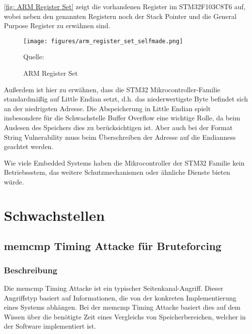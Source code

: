 \documentclass[a4paper,
DIV=13,
12pt,
BCOR=10mm,
department=FakIM,
oneside,
parskip=half,
automark,
listof=totocnumbered,
bibliography=totocnumbered,
acronym=totocnumbered
] {OTHRartcl}
\newcommand*{\quelle}[1]{\par\raggedleft\footnotesize Quelle:~#1}
\begin{document}
\autoref{fig: ARM Register Set} zeigt die vorhandenen Register im STM32F103C8T6 auf, wobei neben den genannten Registern noch der Stack Pointer und die General Purpose Register zu erwähnen sind. \cite{STM32F103Cx DataSheets}
\begin{figure}[ht!]
\begin{center}
  \texttt{[image: figures/arm\_register\_set\_selfmade.png]}
  \quelle{\cite{STM32F103Cx DataSheets}}
  \caption{ARM Register Set}
  \label{fig: ARM Register Set}
\end{center}
\end{figure}

Außerdem ist hier zu erwähnen, dass die STM32 Mikrocontroller-Familie standardmäßig auf Little Endian setzt, d.h. das niederwertigste Byte befindet sich an der niedrigsten Adresse. %
Die Abspeicherung in Little Endian spielt insbesondere für die Schwachstelle Buffer Overflow eine wichtige Rolle, da beim Auslesen des
Speichers dies zu berücksichtigen ist. Aber auch bei der Format String Vulnerability muss beim Überschreiben der Adresse auf die Endianness geachtet werden. \cite{STM32F103Cx DataSheets} \cite{STM32F10xxx/20xxx/21xxx/L1xxx3Cx8 DataSheets}

Wie viele Embedded Systems haben die Mikrocontroller der STM32 Familie kein Betriebssstem, das weitere Schutzmechanismen oder ähnliche Dienste bieten würde.

\section{Schwachstellen}
\label{sec:Schwachstellen}
\subsection{memcmp Timing Attacke für Bruteforcing}
\subsubsection{Beschreibung}
Die memcmp Timing Attacke ist ein typischer Seitenkanal-Angriff. Dieser Angriffstyp basiert auf Informationen, die von der konkreten Implementierung eines Systems abhängen.
Bei der memcmp Timing Attacke basiert dies auf dem Wissen über die benötigte Zeit eines Vergleichs von Speicherbereichen, welcher in der Software implementiert ist. \cite{Hardware Hacking Handbook}
\end{document}
